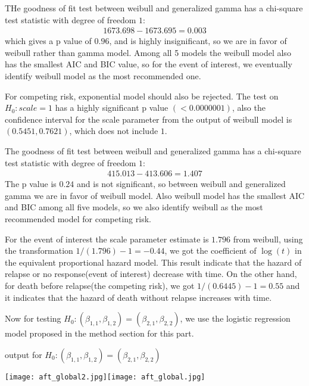 \documentclass[times, doublespace]{simauth}
\begin{document}
THe goodness of fit test between weibull and generalized gamma has a chi-square test statistic with degree of freedom $1$:
\begin{align*}
	1673.698 - 1673.695 = 0.003
\end{align*}
which gives a p value of $0.96$, and is highly insignificant, so we are in favor of weibull rather than gamma model. Among all 5 models the weibull model also has the smallest AIC and BIC value, so for the event of interest, we eventually identify weibull model as the most recommended one.

For competing risk, exponential model should also be rejected. The test on $H_0: scale = 1$ has a highly significant p value $(<0.0000001)$, also the confidence interval for the scale parameter from the output of weibull model is $(0.5451, 0.7621)$, which does not include $1$.

The goodness of fit test between weibull and generalized gamma has a chi-square test statistic with degree of freedom $1$:
\begin{align*}
	415.013 - 413.606 = 1.407
\end{align*}	
The p value is $0.24$ and is not significant, so between weibull and generalized gamma we are in favor of weibull model. Also weibull model has the smallest AIC and BIC among all five models, so we also identify weibull as the most recommended model for competing risk.

For the event of interest the scale parameter estimate is $1.796$ from weibull, using the transformation $1/(1.796) - 1 = -0.44$, we got the coefficient of $\log(t)$ in the equivalent proportional hazard model. This result indicate that the hazard of relapse or no response(event of interest) decrease with time. On the other hand, for death before relapse(the competing risk), we got $1/(0.6445) - 1 = 0.55$ and it indicates that the hazard of death without relapse increases with time.

Now for testing $H_0: (\beta_{1, 1}, \beta_{1, 2}) = (\beta_{2, 1}, \beta_{2, 2})$, we use the logistic regression model proposed in the method section for this part.

\begin{table}[!htb]
	\begin{center}
		\caption{output for $H_0: (\beta_{1, 1}, \beta_{1, 2}) = (\beta_{2, 1}, \beta_{2, 2})$}
		\texttt{[image: aft\_global2.jpg]}\texttt{[image: aft\_global.jpg]}
	\end{center}
\end{table}
\end{document}
